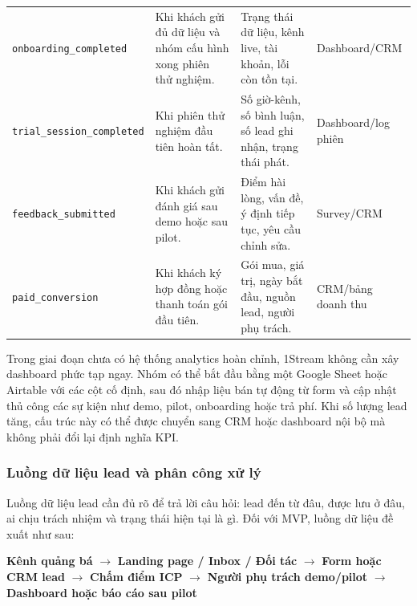 \begin{table}[H]
\begin{tabularx}{\linewidth}{@{}L{3.2cm}Y Y L{2.4cm}@{}}
        \texttt{onboarding\_completed} &
        Khi khách gửi đủ dữ liệu và nhóm cấu hình xong phiên thử nghiệm. &
        Trạng thái dữ liệu, kênh live, tài khoản, lỗi còn tồn tại. &
        Dashboard/CRM \\

        \texttt{trial\_session\_completed} &
        Khi phiên thử nghiệm đầu tiên hoàn tất. &
        Số giờ-kênh, số bình luận, số lead ghi nhận, trạng thái phát. &
        Dashboard/log phiên \\

        \texttt{feedback\_submitted} &
        Khi khách gửi đánh giá sau demo hoặc sau pilot. &
        Điểm hài lòng, vấn đề, ý định tiếp tục, yêu cầu chỉnh sửa. &
        Survey/CRM \\

        \texttt{paid\_conversion} &
        Khi khách ký hợp đồng hoặc thanh toán gói đầu tiên. &
        Gói mua, giá trị, ngày bắt đầu, nguồn lead, người phụ trách. &
        CRM/bảng doanh thu \\ \bottomrule
    \end{tabularx}
\end{table}

Trong giai đoạn chưa có hệ thống analytics hoàn chỉnh, 1Stream không cần xây
dashboard phức tạp ngay. Nhóm có thể bắt đầu bằng một Google Sheet hoặc Airtable
với các cột cố định, sau đó nhập liệu bán tự động từ form và cập nhật thủ công
các sự kiện như demo, pilot, onboarding hoặc trả phí. Khi số lượng lead tăng,
cấu trúc này có thể được chuyển sang CRM hoặc dashboard nội bộ mà không phải đổi
lại định nghĩa KPI.

\subsubsection{Luồng dữ liệu lead và phân công xử lý}

Luồng dữ liệu lead cần đủ rõ để trả lời câu hỏi: lead đến từ đâu, được lưu ở đâu,
ai chịu trách nhiệm và trạng thái hiện tại là gì. Đối với MVP, luồng dữ liệu đề
xuất như sau:

\begin{center}
\small
\textbf{Kênh quảng bá} $\rightarrow$
\textbf{Landing page / Inbox / Đối tác} $\rightarrow$
\textbf{Form hoặc CRM lead} $\rightarrow$
\textbf{Chấm điểm ICP} $\rightarrow$
\textbf{Người phụ trách demo/pilot} $\rightarrow$
\textbf{Dashboard hoặc báo cáo sau pilot}
\end{center}

